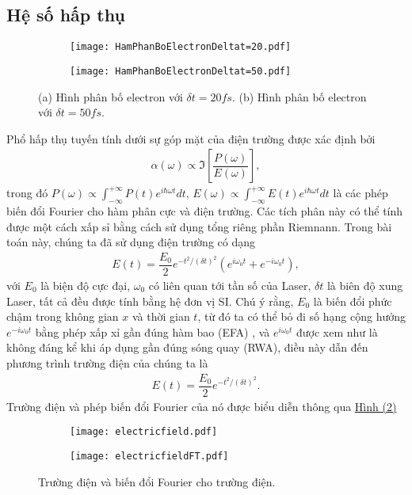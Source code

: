 \documentclass[%
reprint,
amsmath,amssymb,
superscriptaddress,
aps,
]{revtex4-2}
\newcommand{\f}[2]{\dfrac{#1}{#2}}
\begin{document}
\subsection{Hệ số hấp thụ}
\begin{figure*}[htb]
	\centering
	\begin{subfigure}[b]{0.46\textwidth}
		\centering
		\texttt{[image: HamPhanBoElectronDeltat=20.pdf]}
		\caption{}
		\label{fig:HamPhanBoElectronDeltat=20}
	\end{subfigure}
	\begin{subfigure}[b]{0.46\textwidth}
		\centering
		\texttt{[image: HamPhanBoElectronDeltat=50.pdf]}
		\caption{}
		\label{fig:HamPhanBoElectronDeltat=50}
	\end{subfigure}
	\caption{
		(a) Hình phân bố electron với $\delta t = 20 fs$. 
		(b) Hình phân bố electron với $\delta t = 50 fs$. 
	}
\end{figure*}
Phổ hấp thụ tuyến tính dưới sự góp mặt của điện trường được xác định bởi \cite{doi:10.1142/7184}
\begin{gather}
	\alpha(\omega) \propto \Im\left[\f{P(\omega)}{E(\omega)}\right],
\end{gather}
trong đó $P(\omega)\propto\int_{-\infty}^{+\infty} P(t) e^{i \hbar \omega t} dt$, $ E(\omega)\propto\int_{-\infty}^{+\infty} E(t) e^{i \hbar \omega t} dt$ là các phép biến đổi Fourier cho hàm phân cực và điện trường. Các tích phân này có thể tính được một cách xấp sỉ bằng cách sử dụng tổng riêng phần Riemnann. Trong bài toán này, chúng ta đã sử dụng điện trường có dạng
\begin{gather}
	E(t) = \f{E_{0}}{2} e^{- t^{2} / (\delta t)^{2}} (e^{i\omega_{0} t} + e^{-i\omega_{0} t}),
\end{gather}
với $E_{0}$ là biện độ cực đại, $\omega_{0}$ có liên quan tới tần số của Laser, $\delta t$ là biên độ xung Laser, tất cả đều được tính bằng hệ đơn vị SI. Chú ý rằng, $E_{0}$ là biến đổi phức chậm trong không gian $x$ và thời gian $t$, từ đó ta có thể bỏ đi số hạng cộng hưởng $e^{-i \omega_{0} t}$ bằng phép xấp xỉ gần đúng hàm bao (EFA) \cite{sakurai2020modern}, và $e^{i \omega_{0} t}$ được xem như là không đáng kể khi áp dụng gần đúng sóng quay (RWA), điều này dẫn đến phương trình trường điện của chúng ta là
\begin{gather}
	E(t) = \f{E_{0}}{2} e^{-t^{2} / (\delta t)^{2}}.
\end{gather}
Trường điện và phép biến đổi Fourier của nó được biểu diễn thông qua \hyperref[fig:electric field]{Hình (2)}
\begin{figure}[H]
	\centering
	\begin{subfigure}[h]{4.25cm}
		\centering
		\texttt{[image: electricfield.pdf]}
		\caption{}
		\label{fig:electric field}
	\end{subfigure}
	\begin{subfigure}[h]{4.25cm}
		\centering
		\texttt{[image: electricfieldFT.pdf]}
		\caption{}
		\label{fig:electric field FT}
	\end{subfigure}
	\caption{
		Trường điện và biến đổi Fourier cho trường điện. 
	}
\end{figure}
\end{document}
